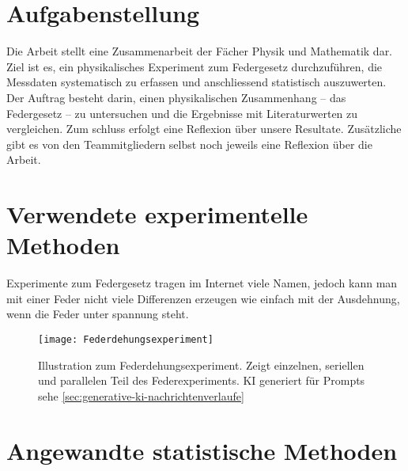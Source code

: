 \documentclass[../main.tex]{subfiles} %
\begin{document}
\section{Aufgabenstellung}\label{sec:aufgabenstellung}

Die Arbeit stellt eine Zusammenarbeit der Fächer Physik und Mathematik dar.
Ziel ist es, ein physikalisches Experiment zum Federgesetz durchzuführen, die Messdaten systematisch zu erfassen und anschliessend statistisch auszuwerten.
Der Auftrag besteht darin, einen physikalischen Zusammenhang – das Federgesetz – zu untersuchen und die Ergebnisse mit Literaturwerten zu vergleichen.
Zum schluss erfolgt eine Reflexion über unsere Resultate.
Zusätzliche gibt es von den Teammitgliedern selbst noch jeweils eine Reflexion über die Arbeit.

\section{Verwendete experimentelle Methoden}\label{sec:verwendete-experimentelle-methoden}

Experimente zum Federgesetz tragen im Internet viele Namen, jedoch kann man mit einer Feder nicht viele Differenzen
erzeugen wie einfach mit der Ausdehnung, wenn die Feder unter spannung steht.

\begin{figure}[h]
    \centering
    \texttt{[image: Federdehungsexperiment]}
    \caption{Illustration zum Federdehungsexperiment. Zeigt einzelnen, seriellen und parallelen Teil des Federexperiments. KI generiert für Prompts sehe \ref{sec:generative-ki-nachrichtenverlaufe}}
    \label{fig:mesh1}
\end{figure}

\section{Angewandte statistische Methoden}\label{sec:angewandte-statistische-methoden}
\end{document}
